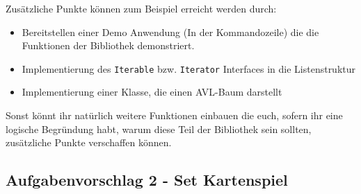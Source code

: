 \documentclass[a4paper,
			   fontsize=12pt]{article}
\begin{document}
Zusätzliche Punkte können zum Beispiel erreicht werden durch:
\begin{itemize}
	\item Bereitstellen einer Demo Anwendung (In der Kommandozeile) die die Funktionen der Bibliothek demonstriert.
	\item Implementierung des \texttt{Iterable} bzw. \texttt{Iterator} Interfaces in die Listenstruktur
	\item Implementierung einer Klasse, die einen AVL-Baum darstellt
\end{itemize}

Sonst könnt ihr natürlich weitere Funktionen einbauen die euch, sofern ihr eine logische Begründung habt, warum diese Teil der Bibliothek sein sollten, zusätzliche Punkte verschaffen können.
\vspace{0,75cm}

\subsection*{Aufgabenvorschlag 2 - Set Kartenspiel}
\end{document}
